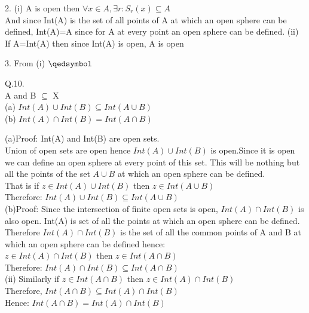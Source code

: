 \documentclass{article}
\begin{document}
2. (i) A is open then $\forall x \in A , \exists r: S_r(x) \subseteq A $\\
And since Int(A) is the set of all points of A at which an open sphere can be 
defined, Int(A)=A since for A at every point an open sphere can be defined.
(ii) If A=Int(A) then since Int(A) is open, A is open

3. From (i) 
$\qedsymbol$

\proof Q.10. \\
A and B $\subseteq$ X\\
(a) $Int(A) \cup Int(B) \subseteq Int (A \cup B)$\\
(b) $Int(A) \cap Int(B) = Int(A\cap B)$


(a)Proof: Int(A) and Int(B) are open sets.\\
Union of open sets are open hence $Int(A) \cup Int(B)$ is open.Since it is open
we can define an open sphere at every point of this set. This will be nothing 
but all the points of the set $A \cup B$ at which an open sphere can be defined.\\
That is if $z \in Int(A) \cup Int(B)$ then $z \in Int(A \cup B)$\\
Therefore: $Int(A) \cup Int(B) \subseteq Int( A \cup B)$\\
(b)Proof: Since the intersection of finite open sets is open, $Int(A) \cap Int(B)$ is also open. 
Int(A) is set of all the points at which an open sphere can be defined. Therefore $Int(A) \cap Int(B)$ is the set of all the common points of A and B at which an open sphere can be defined hence:\\
 $z \in Int(A) \cap Int(B)$ then $z \in Int(A \cap B)$\\
Therefore: $Int(A) \cap Int(B) \subseteq Int( A \cap B)$\\
(ii) Similarly if $z \in  Int( A \cap B) $ then $z \in Int(A) \cap Int(B)$\\
Therefore, $Int( A \cap B) \subseteq Int(A) \cap Int(B) $\\
Hence: $Int( A \cap B) = Int(A) \cap Int(B) $\
\end{document}
